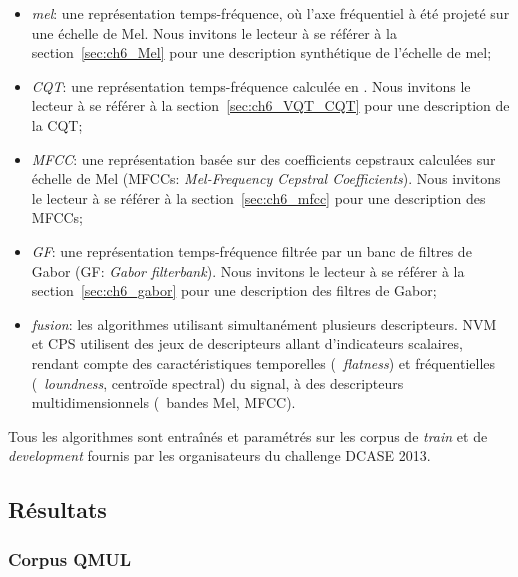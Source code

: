 \begin{itemize}
\item \emph{mel}: une représentation temps-fréquence, où l'axe fréquentiel à été projeté sur une échelle de Mel. Nous invitons le lecteur à se référer à la section~\ref{sec:ch6_Mel} pour une description synthétique de l'échelle de mel;
\item \emph{CQT}: une représentation temps-fréquence calculée en . Nous invitons le lecteur à se référer à la section~\ref{sec:ch6_VQT_CQT} pour une description de la CQT;
\item \emph{MFCC}: une représentation basée sur des coefficients cepstraux  calculées  sur échelle de Mel (MFCCs: \emph{Mel-Frequency Cepstral Coefficients}). Nous invitons le lecteur à se référer à la section~\ref{sec:ch6_mfcc} pour une description des MFCCs;
\item \emph{GF}: une représentation temps-fréquence filtrée par un banc de filtres de Gabor (GF: \emph{Gabor filterbank}). Nous invitons le lecteur à se référer à la section~\ref{sec:ch6_gabor} pour une description des filtres de Gabor;
\item \emph{fusion}: les algorithmes utilisant simultanément plusieurs descripteurs. NVM et CPS utilisent des jeux de descripteurs allant d'indicateurs scalaires, rendant compte des caractéristiques temporelles (\eg~\emph{flatness}) et fréquentielles (\eg~\emph{loundness}, centroïde spectral) du signal, à des descripteurs multidimensionnels (\eg~bandes Mel, MFCC).
\end{itemize}
Tous les algorithmes sont entraînés et paramétrés sur les corpus de \emph{train} et de \emph{development} fournis par les organisateurs du challenge DCASE 2013. \\

\subsection{Résultats}

\subsubsection{Corpus QMUL}

